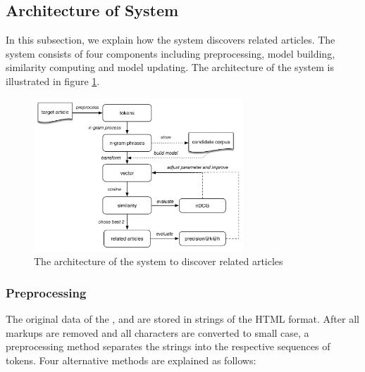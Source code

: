 \begin{description}
\label{tab:def_terms}
\end{description}

\bigbreak

\subsection{Architecture of System}
\label{sec:4.3}

In this subsection, we explain how the system discovers related articles. The system consists of four components including preprocessing, model building, similarity computing and model updating. The architecture of the system is illustrated in figure \ref{fig:unsupervised}. 

\begin{figure}[!htb]
    \centering
    \includegraphics[width=0.7\textwidth]{fig/unsupervise}
    \caption{The architecture of the system to discover related articles}
    \label{fig:unsupervised}
\end{figure}

\subsubsection{Preprocessing}
The original data of the \ititle{}, \isummary{} and \icontent{} are stored in strings of the HTML format. After all markups are removed and all characters are converted to small case, a preprocessing method separates the strings into the respective sequences of tokens. Four alternative methods are explained as follows:

